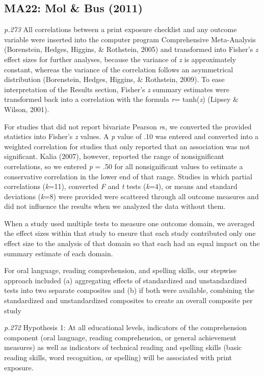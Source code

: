 \documentclass{article}
\begin{document}
\subsection*{MA22: Mol \& Bus (2011)}

\textit{p.273} All correlations between a print exposure checklist and any outcome variable were inserted into the computer program Comprehensive Meta-Analysis (Borenstein, Hedges, Higgins, \& Rothstein, 2005) and transformed into Fisher’s \textit{z} effect sizes for further analyses, because the variance of \textit{z} is approximately constant, whereas the variance of the correlation follows an asymmetrical distribution (Borenstein, Hedges, Higgins, \& Rothstein, 2009). To ease interpretation of the Results section, Fisher’s \textit{z} summary estimates were transformed back into a correlation with the formula \textit{r}= tanh(\textit{z}) (Lipsey \& Wilson, 2001).

For studies that did not report bivariate Pearson \textit{r}s, we converted the provided statistics into Fisher’s \textit{z} values. A \textit{p} value of .10 was entered and converted into a weighted correlation for studies that only reported that an association was not significant. Kalia (2007), however, reported the range of nonsignificant correlations, so we entered \textit{p} = .50 for all nonsignificant values to estimate a conservative correlation in the lower end of that range. Studies in which partial correlations (\textit{k}=11), converted \textit{F} and \textit{t} tests (\textit{k}=4), or means and standard deviations (\textit{k}=8) were provided were scattered through all outcome measures and did not influence the results when we analyzed the data without them.

When a study used multiple tests to measure one outcome domain, we averaged the effect sizes within that study to ensure that each study contributed only one effect size to the analysis of that domain so that each had an equal impact on the summary estimate of each domain.

For oral language, reading comprehension, and spelling skills, our stepwise approach included (a) aggregating effects of standardized and unstandardized tests into two separate composites and (b) if both were available, combining the standardized and unstandardized composites to create an overall composite per study

\textit{p.272} Hypothesis 1: At all educational levels, indicators of the comprehension component (oral language, reading comprehension, or general achievement measures) as well as indicators of technical reading and spelling skills (basic reading
skills, word recognition, or spelling) will be associated with print exposure.
\end{document}
